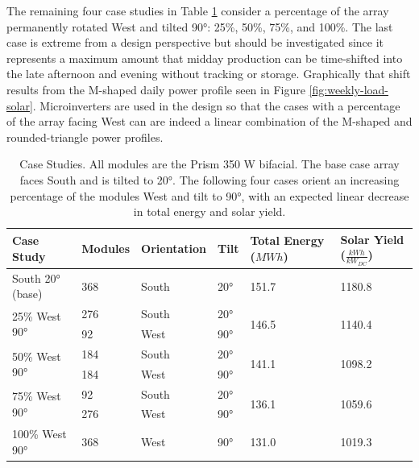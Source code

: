 \documentclass[journal,article,submit,pdftex,moreauthors]{Definitions/mdpi}
\begin{document}
The remaining four case studies in Table \ref{tab:casestudies} consider a percentage of the array permanently rotated West and tilted 90°: 25\%, 50\%, 75\%, and 100\%. The last case is extreme from a design perspective but should be investigated since it represents a maximum amount that midday production can be time-shifted into the late afternoon and evening without tracking or storage. Graphically that shift results from the M-shaped daily power profile seen in Figure \ref{fig:weekly-load-solar}. Microinverters are used in the design so that the cases with a percentage of the array facing West can are indeed a linear combination of the M-shaped and rounded-triangle power profiles.

\begin{table}
  \caption{Case Studies. All modules are the Prism 350 W bifacial. The base case array faces South and is tilted to 20°. The following four cases orient an increasing percentage of the modules West and tilt to 90°, with an expected linear decrease in total energy and solar yield.}
  \label{tab:casestudies}
  \begin{tabularx}{\textwidth}{XXXXXX}
    \toprule
    Case Study                     & Modules & Orientation & Tilt & Total Energy ($MWh$)   & Solar Yield ($\frac{kWh}{kW_{DC}}$) \\
    \midrule
    South 20° (base)               & 368     & South       & 20°  & 151.7                  & 1180.8                              \\
    \hline
    \multirow{2}{*}{25\% West 90°} & 276     & South       & 20°  & \multirow{2}{*}{146.5} & \multirow{2}{*}{1140.4}             \\
                                   & 92      & West        & 90°  &                        &                                     \\
    \hline
    \multirow{2}{*}{50\% West 90°} & 184     & South       & 20°  & \multirow{2}{*}{141.1} & \multirow{2}{*}{1098.2}             \\
                                   & 184     & West        & 90°  &                        &                                     \\
    \hline
    \multirow{2}{*}{75\% West 90°} & 92      & South       & 20°  & \multirow{2}{*}{136.1} & \multirow{2}{*}{1059.6}             \\
                                   & 276     & West        & 90°  &                        &                                     \\
    \hline
    100\% West 90°                 & 368     & West        & 90°  & 131.0                  & 1019.3                              \\
    \bottomrule
  \end{tabularx}
\end{table}
\end{document}
